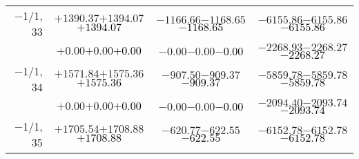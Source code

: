 \documentclass[compress]{beamer}
\begin{document}
\begin{frame}
{\begin{tabular}{r | c | c | c}
$-$1/1, 33 & $+1390.37$\hspace{0.1 cm}$+1394.07$\hspace{0.1 cm}\textcolor{black}{$+1394.07$} & $-1166.66$\hspace{0.1 cm}$-1168.65$\hspace{0.1 cm}\textcolor{black}{$-1168.65$} & $-6155.86$\hspace{0.1 cm}$-6155.86$\hspace{0.1 cm}\textcolor{black}{$-6155.86$} \\
           & $+0.00$\hspace{0.1 cm}$+0.00$\hspace{0.1 cm}\textcolor{black}{$+0.00$} & $-0.00$\hspace{0.1 cm}$-0.00$\hspace{0.1 cm}\textcolor{black}{$-0.00$} & $-2268.93$\hspace{0.1 cm}$-2268.27$\hspace{0.1 cm}\textcolor{black}{$-2268.27$} \\
$-$1/1, 34 & $+1571.84$\hspace{0.1 cm}$+1575.36$\hspace{0.1 cm}\textcolor{black}{$+1575.36$} & $-907.50$\hspace{0.1 cm}$-909.37$\hspace{0.1 cm}\textcolor{black}{$-909.37$} & $-5859.78$\hspace{0.1 cm}$-5859.78$\hspace{0.1 cm}\textcolor{black}{$-5859.78$} \\
           & $+0.00$\hspace{0.1 cm}$+0.00$\hspace{0.1 cm}\textcolor{black}{$+0.00$} & $-0.00$\hspace{0.1 cm}$-0.00$\hspace{0.1 cm}\textcolor{black}{$-0.00$} & $-2094.40$\hspace{0.1 cm}$-2093.74$\hspace{0.1 cm}\textcolor{black}{$-2093.74$} \\
$-$1/1, 35 & $+1705.54$\hspace{0.1 cm}$+1708.88$\hspace{0.1 cm}\textcolor{black}{$+1708.88$} & $-620.77$\hspace{0.1 cm}$-622.55$\hspace{0.1 cm}\textcolor{black}{$-622.55$} & $-6152.78$\hspace{0.1 cm}$-6152.78$\hspace{0.1 cm}\textcolor{black}{$-6152.78$} \\

\end{tabular}}
\end{frame}
\end{document}
